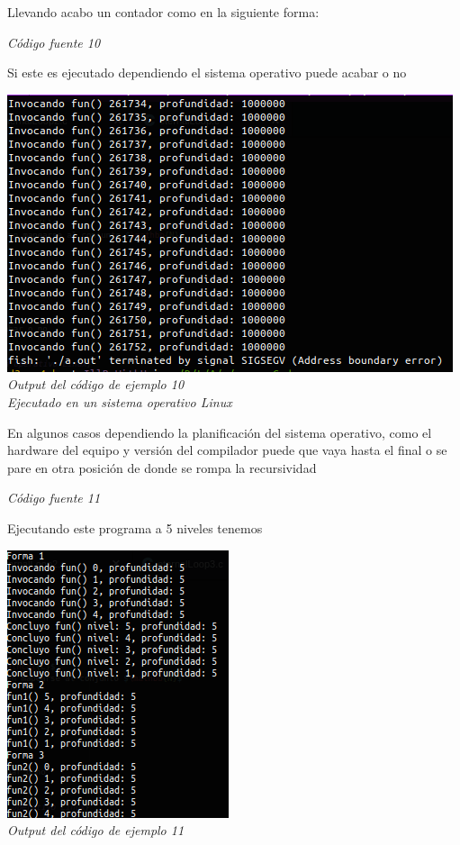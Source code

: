 \documentclass[10pt,executivepaper]{article}
\begin{document}
Llevando acabo un contador como en la siguiente forma:

\begin{center}
\textit{Código fuente 10}\\
\end{center}
Si este es ejecutado dependiendo el sistema operativo puede acabar o no
\begin{center}
\includegraphics[scale=0.5]{screens/screen4.png}\\
\textit{Output del código de ejemplo 10\\Ejecutado en un sistema operativo Linux}
\end{center}
En algunos casos dependiendo la planificación del sistema operativo, como el hardware del equipo y versión del compilador puede que vaya hasta el final o se pare en otra posición de donde se rompa la recursividad

\begin{center}
\textit{Código fuente 11}\\
\end{center}
Ejecutando este programa a 5 niveles tenemos
\begin{center}
\includegraphics[scale=0.5]{screens/screen5.png}\\
\textit{Output del código de ejemplo 11}
\end{center}
\printindex
\end{document}
